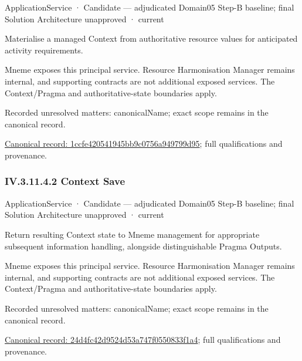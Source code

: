 \label{element:1ccfe420541945bb9c0756a949799d95}
{\small ApplicationService · Candidate — adjudicated Domain05 Step-B baseline; final Solution Architecture unapproved · current}\par

Materialise a managed Context from authoritative resource values for anticipated activity requirements.



Mneme exposes this principal service. Resource Harmonisation Manager remains internal, and supporting contracts are not additional exposed services. The Context/Pragma and authoritative-state boundaries apply.


{\small Recorded unresolved matters: canonicalName; exact scope remains in the canonical record.}\par
{\footnotesize \href{../../../../../../../../continuum/application/application-service/1ccfe420541945bb9c0756a949799d95.md}{Canonical record: 1ccfe420541945bb9c0756a949799d95}; full qualifications and provenance.}\par
\subsubsection*{IV.3.11.4.2 Context Save}
\label{navigation:IV.3.11.4.2}

\label{element:24d4fc42d9524d53a747f0550833f1a4}
{\small ApplicationService · Candidate — adjudicated Domain05 Step-B baseline; final Solution Architecture unapproved · current}\par

Return resulting Context state to Mneme management for appropriate subsequent information handling, alongside distinguishable Pragma Outputs.



Mneme exposes this principal service. Resource Harmonisation Manager remains internal, and supporting contracts are not additional exposed services. The Context/Pragma and authoritative-state boundaries apply.


{\small Recorded unresolved matters: canonicalName; exact scope remains in the canonical record.}\par
{\footnotesize \href{../../../../../../../../continuum/application/application-service/24d4fc42d9524d53a747f0550833f1a4.md}{Canonical record: 24d4fc42d9524d53a747f0550833f1a4}; full qualifications and provenance.}\par
